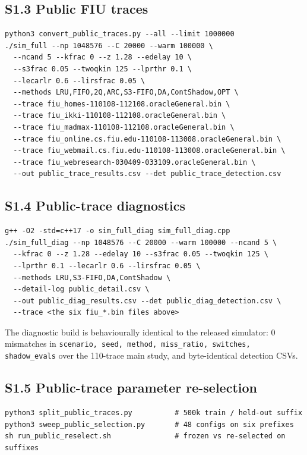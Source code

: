\documentclass[journal,onecolumn]{IEEEtran}
\begin{document}
\subsection{S1.3 Public FIU traces}
\begin{verbatim}
python3 convert_public_traces.py --all --limit 1000000
./sim_full --np 1048576 --C 20000 --warm 100000 \
  --ncand 5 --kfrac 0 --z 1.28 --edelay 10 \
  --s3frac 0.05 --twoqkin 125 --lprthr 0.1 \
  --lecarlr 0.6 --lirsfrac 0.05 \
  --methods LRU,FIFO,2Q,ARC,S3-FIFO,DA,ContShadow,OPT \
  --trace fiu_homes-110108-112108.oracleGeneral.bin \
  --trace fiu_ikki-110108-112108.oracleGeneral.bin \
  --trace fiu_madmax-110108-112108.oracleGeneral.bin \
  --trace fiu_online.cs.fiu.edu-110108-113008.oracleGeneral.bin \
  --trace fiu_webmail.cs.fiu.edu-110108-113008.oracleGeneral.bin \
  --trace fiu_webresearch-030409-033109.oracleGeneral.bin \
  --out public_trace_results.csv --det public_trace_detection.csv
\end{verbatim}

\subsection{S1.4 Public-trace diagnostics}
\begin{verbatim}
g++ -O2 -std=c++17 -o sim_full_diag sim_full_diag.cpp
./sim_full_diag --np 1048576 --C 20000 --warm 100000 --ncand 5 \
  --kfrac 0 --z 1.28 --edelay 10 --s3frac 0.05 --twoqkin 125 \
  --lprthr 0.1 --lecarlr 0.6 --lirsfrac 0.05 \
  --methods LRU,S3-FIFO,DA,ContShadow \
  --detail-log public_detail.csv \
  --out public_diag_results.csv --det public_diag_detection.csv \
  --trace <the six fiu_*.bin files above>
\end{verbatim}
The diagnostic build is behaviourally identical to the released simulator:
0 mismatches in \texttt{scenario, seed, method, miss\_ratio, switches,
shadow\_evals} over the 110-trace main study, and byte-identical detection CSVs.

\subsection{S1.5 Public-trace parameter re-selection}
\begin{verbatim}
python3 split_public_traces.py          # 500k train / held-out suffix
python3 sweep_public_selection.py       # 48 configs on six prefixes
sh run_public_reselect.sh               # frozen vs re-selected on suffixes
\end{verbatim}
\end{document}
